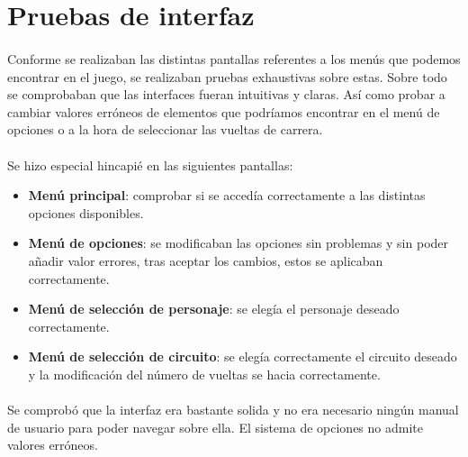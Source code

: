 \section{Pruebas de interfaz}

\paragraph{}
Conforme se realizaban las distintas pantallas referentes a los menús que podemos encontrar en el juego, se realizaban pruebas 
exhaustivas sobre estas. Sobre todo se comprobaban que las interfaces fueran intuitivas y claras. Así como probar a cambiar 
valores erróneos de elementos que podríamos encontrar en el menú de opciones o a la hora de seleccionar las vueltas de carrera.

\paragraph{}
Se hizo especial hincapié en las siguientes pantallas:

\begin{itemize}
    \item \textbf{Menú principal}: comprobar si se accedía correctamente a las distintas opciones disponibles.
    
    \item \textbf{Menú de opciones}: se modificaban las opciones sin problemas y sin poder añadir valor errores, tras aceptar
    los cambios, estos se aplicaban correctamente.
    
    \item \textbf{Menú de selección de personaje}: se elegía el personaje deseado correctamente.
    
    \item \textbf{Menú de selección de circuito}: se elegía correctamente el circuito deseado y la modificación del número de 
    vueltas se hacia correctamente.
\end{itemize}

\paragraph{}
Se comprobó que la interfaz era bastante solida y no era necesario ningún manual de usuario para poder navegar sobre ella. El 
sistema de opciones no admite valores erróneos.
